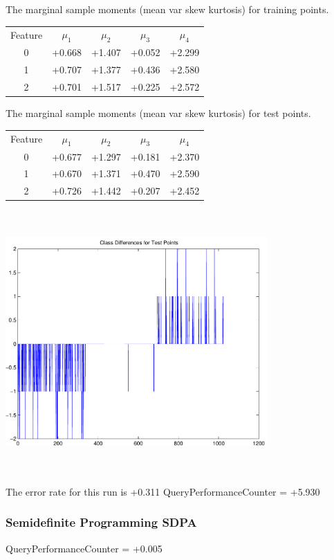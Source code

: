 \documentclass[9pt]{article}
\theoremstyle{plain}
\theoremstyle{definition}
\theoremstyle{remark}
\numberwithin{equation}{section}
\begin{document}
The marginal sample moments (mean var skew kurtosis) for training points.\newline
\begin{tabular}{ c |  c  c  c  c}
Feature & $\mu_1$ & $\mu_2$ & $\mu_3$ & $\mu_4$ \\
0 & +0.668 & +1.407 & +0.052& +2.299 \\
\hline
1 & +0.707 & +1.377 & +0.436& +2.580 \\
\hline
2 & +0.701 & +1.517 & +0.225& +2.572 \\
\hline
\end{tabular}
\newline
The marginal sample moments (mean var skew kurtosis) for test points.\newline
\begin{tabular}{ c | c  c  c  c}
Feature & $\mu_1$ & $\mu_2$ & $\mu_3$ & $\mu_4$ \\
0 & +0.677 & +1.297 & +0.181& +2.370\\
\hline
1 & +0.670 & +1.371 & +0.470& +2.590\\
\hline
2 & +0.726 & +1.442 & +0.207& +2.452\\
\hline
\end{tabular}\newline
\includegraphics[width=10.0cm,height=10.0cm]{classDiffs.pdf}

The error rate for this run is +0.311\newline
QueryPerformanceCounter  =  +5.930
\subsubsection{Semidefinite Programming SDPA}
QueryPerformanceCounter  =  +0.005
\end{document}
